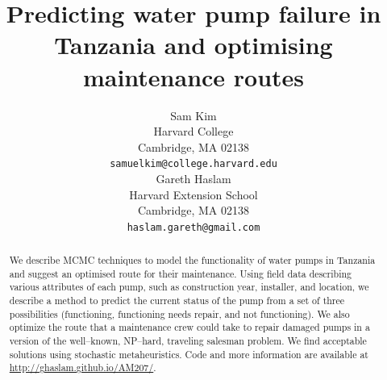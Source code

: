 \documentclass{article} %
\title{Predicting water pump failure in Tanzania and optimising maintenance routes}
\author{
Sam Kim \\
Harvard College\\
Cambridge, MA 02138 \\
\texttt{samuelkim@college.harvard.edu} \\
\And
Gareth Haslam \\
Harvard Extension School\\
Cambridge, MA 02138 \\
\texttt{haslam.gareth@gmail.com} \\
}
\begin{document}
\maketitle

\begin{abstract}
We describe MCMC techniques to model the functionality of water pumps in Tanzania and suggest an optimised route for their maintenance. Using field data describing various attributes of each pump, such as construction year, installer, and location, we describe a method to predict the current status of the pump from a set of three possibilities (functioning, functioning needs repair, and not functioning). We also optimize the route that a maintenance crew could take to repair damaged pumps in a version of the well--known, NP--hard, traveling salesman problem. We find acceptable solutions using stochastic metaheuristics. Code and more information are available at \url{http://ghaslam.github.io/AM207/}.
\end{abstract}
\end{document}
